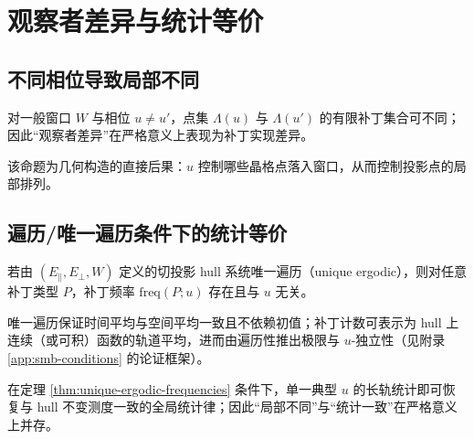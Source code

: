 \section{观察者差异与统计等价}

\subsection{不同相位导致局部不同}

\begin{proposition}[局部实现差异]\label{prop:local-difference}
对一般窗口 $W$ 与相位 $u\neq u'$，点集 $\Lambda(u)$ 与 $\Lambda(u')$ 的有限补丁集合可不同；因此“观察者差异”在严格意义上表现为补丁实现差异。
\end{proposition}

\begin{remark}
该命题为几何构造的直接后果：$u$ 控制哪些晶格点落入窗口，从而控制投影点的局部排列。
\end{remark}

\subsection{遍历/唯一遍历条件下的统计等价}

\begin{theorem}\label{thm:unique-ergodic-frequencies}
若由 $(E_{\parallel},E_{\perp},W)$ 定义的切投影 hull 系统唯一遍历（unique ergodic），则对任意补丁类型 $P$，补丁频率 $\mathrm{freq}(P;u)$ 存在且与 $u$ 无关。
\end{theorem}

\begin{remark}
唯一遍历保证时间平均与空间平均一致且不依赖初值；补丁计数可表示为 hull 上连续（或可积）函数的轨道平均，进而由遍历性推出极限与 $u$-独立性（见附录 \ref{app:smb-conditions} 的论证框架）。
\end{remark}

\begin{corollary}\label{cor:statistical-holography}
在定理 \ref{thm:unique-ergodic-frequencies} 条件下，单一典型 $u$ 的长轨统计即可恢复与 hull 不变测度一致的全局统计律；因此“局部不同”与“统计一致”在严格意义上并存。
\end{corollary}

